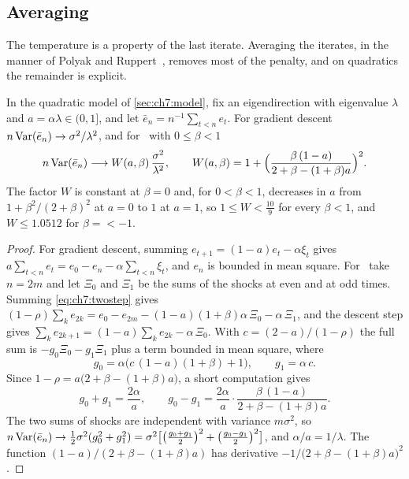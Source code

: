\subsection{Averaging}
The temperature is a property of the last iterate. Averaging the iterates, in the manner of Polyak and Ruppert~\cite{ruppert1988,polyak1992}, removes most of the penalty, and on quadratics the remainder is explicit.

\begin{proposition}\label{prop:ch7:averaging}
In the quadratic model of \cref{sec:ch7:model}, fix an eigendirection with eigenvalue $\lambda$ and $a=\alpha\lambda\in(0,1]$, and let $\bar e_n=n^{-1}\sum_{t<n}e_t$. For gradient descent $n\operatorname{Var}(\bar e_n)\to\sigma^2/\lambda^2$, and for \smmdet\ with $0\le\beta<1$
\[
  n\operatorname{Var}(\bar e_n)\longrightarrow W(a,\beta)\,\frac{\sigma^2}{\lambda^2},\qquad
  W(a,\beta)=1+\Bigl(\frac{\beta\,(1-a)}{2+\beta-(1+\beta)a}\Bigr)^{2} .
\]
The factor $W$ is constant at $\beta=0$ and, for $0<\beta<1$, decreases in $a$ from $1+\beta^2/(2+\beta)^2$ at $a=0$ to $1$ at $a=1$, so $1\le W<\tfrac{10}9$ for every $\beta<1$, and $W\le1.0512$ for $\beta=\lt-1$.
\end{proposition}

\begin{proof}
For gradient descent, summing $e_{t+1}=(1-a)e_t-\alpha\xi_t$ gives $a\sum_{t<n}e_t=e_0-e_n-\alpha\sum_{t<n}\xi_t$, and $e_n$ is bounded in mean square. For \smmdet\ take $n=2m$ and let $\Xi_0$ and $\Xi_1$ be the sums of the shocks at even and at odd times. Summing \eqref{eq:ch7:twostep} gives $(1-\rho)\sum_ke_{2k}=e_0-e_{2m}-(1-a)(1+\beta)\alpha\,\Xi_0-\alpha\,\Xi_1$, and the descent step gives $\sum_ke_{2k+1}=(1-a)\sum_ke_{2k}-\alpha\,\Xi_0$. With $c=(2-a)/(1-\rho)$ the full sum is $-g_0\Xi_0-g_1\Xi_1$ plus a term bounded in mean square, where
\[
  g_0=\alpha\bigl(c\,(1-a)(1+\beta)+1\bigr),\qquad g_1=\alpha\,c .
\]
Since $1-\rho=a\bigl(2+\beta-(1+\beta)a\bigr)$, a short computation gives
\[
  g_0+g_1=\frac{2\alpha}{a},\qquad g_0-g_1=\frac{2\alpha}{a}\cdot\frac{\beta\,(1-a)}{2+\beta-(1+\beta)a} .
\]
The two sums of shocks are independent with variance $m\sigma^2$, so $n\operatorname{Var}(\bar e_n)\to\tfrac12\sigma^2(g_0^2+g_1^2)=\sigma^2\bigl[\bigl(\tfrac{g_0+g_1}2\bigr)^2+\bigl(\tfrac{g_0-g_1}2\bigr)^2\bigr]$, and $\alpha/a=1/\lambda$. The function $(1-a)/(2+\beta-(1+\beta)a)$ has derivative $-1/\bigl(2+\beta-(1+\beta)a\bigr)^2$.
\end{proof}


